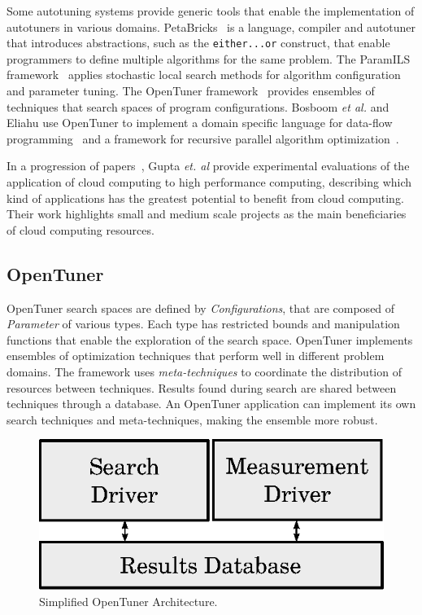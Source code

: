 \documentclass[a4paper, 12pt]{article}
\begin{document}
Some autotuning systems provide generic tools that enable the implementation of
autotuners in various domains. PetaBricks~\cite{ansel2009petabricks} is a
language, compiler and autotuner that introduces abstractions, such as the
\texttt{\footnotesize either...or} construct, that enable programmers to define
multiple algorithms for the same problem.  The ParamILS
framework~\cite{hutter2009paramils} applies stochastic local search methods
for algorithm configuration and parameter tuning.  The OpenTuner
framework~\cite{ansel2014opentuner} provides ensembles of techniques that
search spaces of program configurations. Bosboom \emph{et al.} and Eliahu use
OpenTuner to implement a domain specific language for data-flow
programming~\cite{bosboom2014streamjit} and a framework for recursive parallel
algorithm optimization~\cite{eliahu2015frpa}.

In a progression of papers~\cite{gupta2012exploring,gupta2014evaluating,gupta2013hpccloud},
Gupta \emph{et. al} provide experimental evaluations of the application of
cloud computing to high performance computing, describing which kind of
applications has the greatest potential to benefit from cloud computing.
Their work highlights small and medium scale projects as the main beneficiaries
of cloud computing resources.

\subsection{OpenTuner} \label{sec:opt}

OpenTuner search spaces are defined by \emph{Configurations}, that are composed
of \emph{Parameter} of various types. Each type has restricted bounds and
manipulation functions that enable the exploration of the search space.
OpenTuner implements ensembles of optimization techniques that
perform well in different problem domains. The framework uses
\emph{meta-techniques} to coordinate the distribution of resources
between techniques.
Results found during search are shared between techniques through a
database. An OpenTuner application can implement its own search
techniques and meta-techniques, making the ensemble more robust.

\begin{figure}[htpb]
    \centering
    \includegraphics[scale=.62]{opentuner-implementation}
    \caption{Simplified OpenTuner Architecture.}
    \label{fig:ot-imp}
\end{figure}
\end{document}
